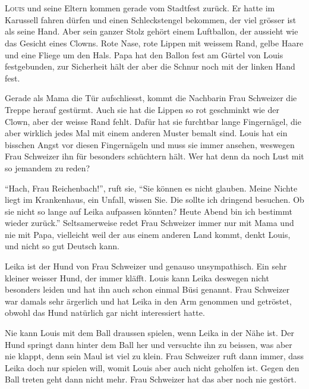 \chapter*{}
\lettrine[lines=3]{\color{DeepPink}L}{ouis} und seine Eltern kommen gerade vom
Stadtfest zurück. Er hatte im Karussell fahren dürfen und einen Schleckstengel
bekommen, der viel grösser ist als seine Hand. Aber sein ganzer Stolz gehört
einem Luftballon, der aussieht wie das Gesicht eines Clowns. Rote Nase, rote
Lippen mit weissem Rand,  gelbe Haare und eine Fliege um den Hals. Papa hat den
Ballon fest am Gürtel von Louis festgebunden, zur Sicherheit hält der aber die
Schnur noch mit der linken Hand fest.

Gerade als Mama die Tür aufschliesst, kommt die Nachbarin Frau Schweizer die
Treppe herauf gestürmt. Auch sie hat die Lippen so rot geschminkt wie der Clown, aber der weisse Rand fehlt. Dafür hat sie furchtbar lange Fingernägel, die aber wirklich jedes Mal mit einem anderen Muster bemalt sind. Louis hat ein bisschen Angst vor diesen Fingernägeln und muss sie immer ansehen, weswegen Frau Schweizer ihn für besonders schüchtern hält. Wer hat denn da noch Lust mit so jemandem zu reden?

\enquote{Hach, Frau Reichenbach!}, ruft sie, \enquote{Sie können es nicht
glauben. Meine Nichte liegt im Krankenhaus, ein Unfall, wissen Sie. Die sollte
ich dringend besuchen. Ob sie nicht so lange auf Leika aufpassen könnten? Heute
Abend bin ich bestimmt wieder zurück.} Seltsamerweise redet Frau Schweizer
immer nur mit Mama und nie mit Papa, vielleicht weil der aus einem anderen Land kommt, denkt Louis, und nicht so gut Deutsch kann.

Leika ist der Hund von Frau Schweizer und genauso unsympathisch. Ein sehr
kleiner weisser Hund, der immer kläfft. Louis kann Leika deswegen nicht
besonders leiden und hat ihn auch schon einmal Büsi genannt. Frau Schweizer war
damals sehr ärgerlich und hat Leika in den Arm genommen und getröstet, obwohl
das Hund natürlich gar nicht interessiert hatte. 

Nie kann Louis mit dem Ball draussen spielen, wenn Leika in der Nähe ist. Der
Hund springt dann hinter dem Ball her und versuchte ihn zu beissen, was aber nie klappt, denn sein Maul ist viel zu klein. Frau Schweizer ruft dann immer, dass Leika doch nur spielen will, womit Louis aber auch nicht geholfen ist. Gegen den Ball treten geht dann nicht mehr. Frau Schweizer hat das aber noch nie gestört.


